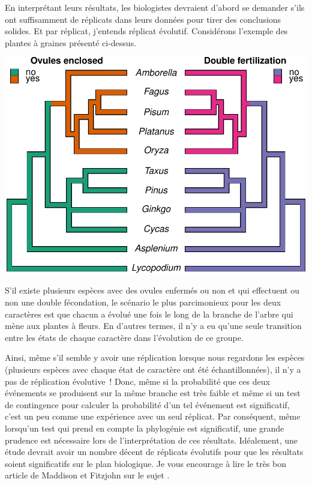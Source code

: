 \documentclass[
]{book}
\begin{document}
En interprétant leurs résultats, les biologistes devraient d'abord se demander s'ils ont suffisamment de réplicats dans leurs données pour tirer des conclusions solides. Et par réplicat, j'entends réplicat évolutif. Considérons l'exemple des plantes à graines présenté ci-dessus.

\begin{center}\includegraphics{pcm-workshop_files/figure-latex/AngiospermsWithCharacters4-1} \end{center}

S'il existe plusieurs espèces avec des ovules enfermés ou non et qui effectuent ou non une double fécondation, le scénario le plus parcimonieux pour les deux caractères est que chacun a évolué une fois le long de la branche de l'arbre qui mène aux plantes à fleurs. En d'autres termes, il n'y a eu qu'une seule transition entre les états de chaque caractère dans l'évolution de ce groupe.

Ainsi, même s'il semble y avoir une réplication lorsque nous regardons les espèces (plusieurs espèces avec chaque état de caractère ont été échantillonnées), il n'y a pas de réplication évolutive~! Donc, même si la probabilité que ces deux événements se produisent sur la même branche est très faible et même si un test de contingence pour calculer la probabilité d'un tel événement est significatif, c'est un peu comme une expérience avec un seul réplicat. Par conséquent, même lorsqu'un test qui prend en compte la phylogénie est significatif, une grande prudence est nécessaire lors de l'interprétation de ces résultats. Idéalement, une étude devrait avoir un nombre décent de réplicats évolutifs pour que les résultats soient significatifs sur le plan biologique. Je vous encourage à lire le très bon article de Maddison et Fitzjohn sur le sujet \citep{maddison2015unsolved}.
\end{document}
